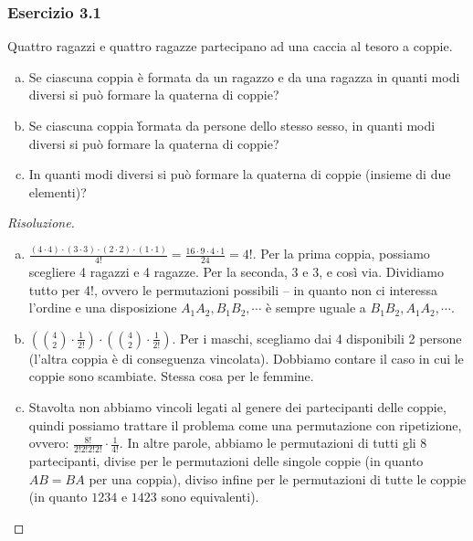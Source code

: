 \documentclass{beamer}
\begin{document}
\begin{frame}[fragile]
	\frametitle{Esercizio 3.1}

	\begin{exercise}
		Quattro ragazzi e quattro ragazze partecipano ad una caccia al tesoro a coppie.
		\begin{enumerate}[(a)]
			\item Se ciascuna coppia \`e formata da un ragazzo e da una ragazza in quanti modi diversi si può formare la quaterna di coppie?
			\item Se ciascuna coppia \` formata da persone dello stesso sesso, in quanti modi diversi si può formare la quaterna di coppie?
			\item In quanti modi diversi si può formare la quaterna di coppie (insieme di due elementi)?
		\end{enumerate}
	\end{exercise}
\end{frame}

\begin{frame}[fragile]
	\begin{proof}[Risoluzione]
		\begin{enumerate}[(a)]
			\item $\frac{(4 \cdot 4) \cdot (3 \cdot 3) \cdot (2 \cdot 2) \cdot (1 \cdot 1)}{4!} = \frac{16 \cdot 9 \cdot 4 \cdot 1}{24} = 4!$. Per la prima coppia, possiamo scegliere 4 ragazzi e 4 ragazze. Per la seconda, 3 e 3, e così via. Dividiamo tutto per 4!, ovvero le permutazioni possibili -- in quanto non ci interessa l'ordine e una disposizione $A_1A_2, B_1B_2, \cdots$ è sempre uguale a $B_1B_2,  A_1A_2, \cdots$.
			\item $ (\binom{4}{2} \cdot \frac{1}{2!}) \cdot (\binom{4}{2} \cdot \frac{1}{2!})$. Per i maschi, scegliamo dai 4 disponibili 2 persone (l'altra coppia è di conseguenza vincolata). Dobbiamo contare il caso in cui le coppie sono scambiate. Stessa cosa per le femmine.
			\item Stavolta non abbiamo vincoli legati al genere dei partecipanti delle coppie, quindi possiamo trattare il problema come una permutazione con ripetizione, ovvero: $\frac{8!}{2!2!2!2!} \cdot \frac{1}{4!}$. In altre parole, abbiamo le permutazioni di tutti gli 8 partecipanti, divise per le permutazioni delle singole coppie (in quanto $AB = BA$ per una coppia), diviso infine per le permutazioni di tutte le coppie (in quanto $1234$ e $1423$ sono equivalenti). \qedhere
		\end{enumerate}
		\qedhere
	\end{proof}

\end{frame}
\end{document}

